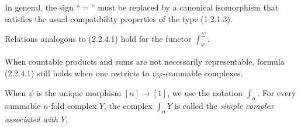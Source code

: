 In general, the sign ``$=$'' must be replaced by a canonical isomorphism that
satisfies the usual compatibility properties of the type (1.2.1.3).

Relations analogous to (2.2.4.1) hold for the functor
$\int_{\varphi}^{\Sigma}$.

When countable products and sums are not necessarily representable, formula
(2.2.4.1) still holds when one restricts to $\psi\varphi$-summable complexes.

When $\psi$ is the unique morphism $[n]\longrightarrow[1]$, we use the
notation $\int_n$. For every summable $n$-fold complex $Y$, the complex
$\int_n Y$ is called the \emph{simple complex associated with $Y$}.
